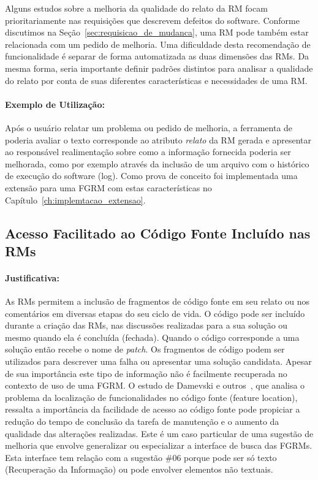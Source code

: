 Alguns estudos sobre a melhoria da qualidade do relato da RM focam
prioritariamente nas requisições que descrevem defeitos do software. Conforme
discutimos na Seção~\ref{sec:requisicao_de_mudanca}, uma RM pode também estar
relacionada com um pedido de melhoria. Uma dificuldade desta recomendação de
funcionalidade é separar de forma automatizada as duas dimensões das RMs. Da
mesma forma, seria importante definir padrões distintos para analisar a
qualidade do relato por conta de suas diferentes características e necessidades
de uma RM\@.

\paragraph{Exemplo de Utilização:}
\label{par:exemplo_s01}

Após o usuário relatar um problema ou pedido de melhoria, a ferramenta de
poderia avaliar o texto corresponde ao atributo \textit{relato} da RM gerada e
apresentar ao responsável realimentação sobre como a informação fornecida
poderia ser melhorada, como por exemplo através da inclusão de um arquivo com o
histórico de execução do software (log). Como prova de conceito foi implementada
uma extensão para uma FGRM com estas características no
Capítulo~\ref{ch:implemtacao_extensao}.

\subsection{Acesso Facilitado ao Código Fonte Incluído nas RMs}
\label{sub:busca_por_código_fonte}


\paragraph{Justificativa:}
\label{par:justificativa_s02}

As RMs permitem a inclusão de fragmentos de código fonte em seu relato ou nos
comentários em diversas etapas do seu ciclo de vida. O código pode ser incluído
durante a criação das RMs, nas discussões realizadas para a sua solução ou mesmo
quando ela é concluída (fechada). Quando o código corresponde a uma solução
então recebe o nome de \textit{patch}. Os fragmentos de código podem ser
utilizados para descrever uma falha ou apresentar uma solução candidata. Apesar
de sua importância este tipo de informação não é facilmente recuperada no
contexto de uso de uma FGRM\@. O estudo de Damevski e
outros~\cite{damevski2016field}, que analisa o problema da localização de
funcionalidades no código fonte (feature location), ressalta a importância da
facilidade de acesso ao código fonte pode propiciar a redução do tempo de
conclusão da tarefa de manutenção e o aumento da qualidade das alterações
realizadas. Este é um caso particular de uma sugestão de melhoria que envolve
generalizar ou especializar a interface de busca das FGRMs. Esta interface tem
relação com a sugestão \#06 porque pode ser só texto (Recuperação da Informação)
ou pode envolver elementos não textuais.


